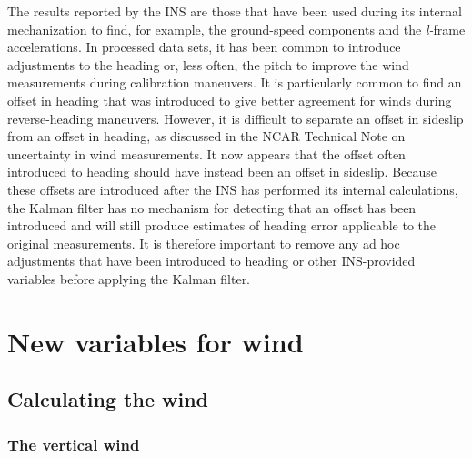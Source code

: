 \documentclass[12pt,twoside,english,12pt,twoside,english]{article}\usepackage[]{graphicx}\usepackage[]{color}
\let\stdsection\section
\renewcommand{\section}{\newpage\stdsection}
\let\OrgIndex\index
\renewcommand*{\index}[1]{\OrgIndex{#1}}
\begin{document}
The results reported
by the INS are those that have been used during its internal mechanization
to find, for example, the ground-speed components
and the \emph{l-}frame
accelerations. In processed data sets,
it has been common to introduce adjustments
to the heading or, less often, the pitch to improve the wind measurements
during calibration maneuvers. It is particularly
common to find an offset in heading
that was introduced to give better agreement for winds during reverse-heading
maneuvers. However, it is difficult
to separate an offset in sideslip from an offset in heading, as discussed
in the NCAR Technical Note on uncertainty in wind measurements. It
now appears that the offset often introduced to heading
should have instead been an offset in sideslip. Because these offsets
are introduced after the INS has performed its internal calculations,
the Kalman filter has no mechanism for detecting that an offset has
been introduced and will still produce estimates of heading error
applicable to the original measurements. It is therefore important
to remove any ad hoc adjustments that have been introduced to heading
or other INS-provided variables before applying the Kalman filter.

\clearpage

\section{New variables for wind\label{sec:KF-variables}}

\subsection{Calculating the wind\label{subsec:KF-wind}}

\subsubsection{The vertical wind\label{subsec:KF-vertical-wind}}
\end{document}

